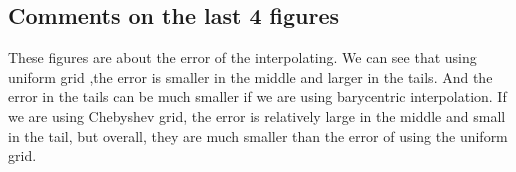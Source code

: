 \documentclass[a4paper]{article}
\begin{document}
\subsection{Comments on the last 4 figures}
These figures are about the error of the interpolating. We can see that using uniform grid ,the error is smaller in the middle and larger in the tails. And the error in the tails can be much smaller if we are using barycentric interpolation. If we are using Chebyshev grid, the error is relatively large in the middle and small in the tail, but overall, they are much smaller than the error of using the uniform grid.
\end{document}
